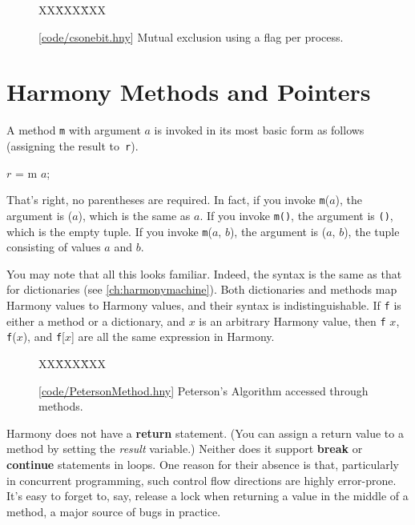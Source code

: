 \documentclass{report}
\newcommand{\harmonysource}[1]{
\begin{tabbing}
XX\=XXX\=XXX\kill
    
\end{tabbing}
}
\newcommand{\harmonylink}[1]{%
[\href{https://www.cs.cornell.edu/home/rvr/harmony/#1}{\underline{#1}}]%
}
\newenvironment{code}{
\tcolorbox
}{
\endtcolorbox
}
\begin{document}
\begin{figure}
\begin{code}
\harmonysource{csonebit}
\end{code}
\caption{\harmonylink{code/csonebit.hny} Mutual exclusion using a flag per process.}
\label{fig:csonebit}
\end{figure}

\chapter{Harmony Methods and Pointers}
\label{ch:method}
%

A method \texttt{m} with argument $a$ is invoked in its
most basic form as follows (assigning the result to~\texttt{r}).
\begin{code}
$r$ = m $a$;
\end{code}
That's right, no parentheses are required.  In fact, if you invoke
\texttt{m}($a$), the argument is ($a$), which is the same
as $a$.
If you invoke \texttt{m()}, the argument is \texttt{()},
which is the empty tuple.
If you invoke \texttt{m}($a$, $b$), the argument is ($a$, $b$),
the tuple consisting of values $a$ and $b$.

You may note that all this looks familiar.  Indeed, the syntax
is the same as that for dictionaries (see \autoref{ch:harmonymachine}).
Both dictionaries and methods map Harmony values to Harmony values,
and their syntax is indistinguishable.
If \texttt{f} is either a method or a
dictionary, and $x$ is an arbitrary Harmony value, then
\texttt{f} $x$, \texttt{f}($x$), and \texttt{f}[$x$] are all
the same expression in Harmony.

\begin{figure}
\begin{code}
\harmonysource{PetersonMethod}
\end{code}
\caption{\harmonylink{code/PetersonMethod.hny} Peterson's Algorithm accessed through methods.}
\label{fig:petersonmethods}
\end{figure}

Harmony does not have a \textbf{return} statement.  (You can assign a return value
to a method by setting the \textit{result} variable.)  Neither does it support
\textbf{break} or \textbf{continue} statements in loops.  One reason for their absence is
that, particularly in concurrent programming, such control flow directions are highly
error-prone.  It's easy to forget to, say, release a lock when returning a value in the
middle of a method, a major source of bugs in practice.
\end{document}
